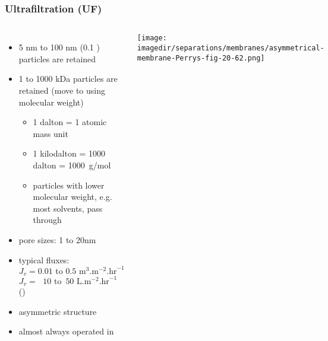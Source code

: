 \begin{frame}\frametitle{Ultrafiltration (UF)}	
	\begin{columns}[c]
			\vspace{-20pt}
			\begin{itemize}
				\item	5 nm to 100 nm (0.1 \micron) particles are retained
				\item	1 to 1000 kDa particles are retained (move to using molecular weight)
				\begin{itemize}
					\item	1 dalton = 1 atomic mass unit
					\item	1 kilodalton = 1000 dalton = 1000~g/mol
					\item	particles with lower molecular weight, e.g. most solvents, pass through
				\end{itemize}
				\item	pore sizes: 1 to 20nm
				\item	typical fluxes: $J_v = 0.01 \text{~to~} 0.5 \text{~m}^3\text{.m}^{-2}.\text{hr}^{-1}$\\$J_v = ~~\,10 \text{~to~} \,50 \text{~L}\text{.m}^{-2}.\text{hr}^{-1}$ ({\color{purple}{LMH}})
				\item	asymmetric structure
				\item	almost always operated in {\color{purple}{TFF}}
			\end{itemize}
			\begin{center}
				\texttt{[image: \\imagedir/separations/membranes/asymmetrical-membrane-Perrys-fig-20-62.png]}
			\end{center}
			\vspace{-12pt}
	\end{columns}
\end{frame}

